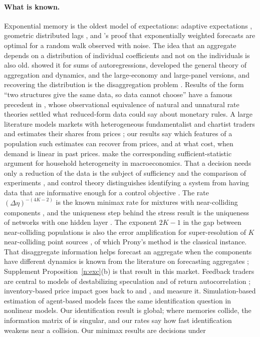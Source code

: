 \documentclass[12pt]{article}
\theoremstyle{definition}
\theoremstyle{remark}
\begin{document}
\paragraph{What is known.} Exponential memory is the oldest model of expectations: adaptive expectations \citep{cagan1956,nerlove1958}, geometric distributed lags \citep{koyck1954}, and \citet{muth1960}'s proof that exponentially weighted forecasts are optimal for a random walk observed with noise. The idea that an aggregate depends on a distribution of individual coefficients and not on the individuals is also old. \citet{granger1980} showed it for sums of autoregressions, \citet{forni1997} developed the general theory of aggregation and dynamics, \citet{zaffaroni2004} and \citet{pesaran2014} the large-economy and large-panel versions, and recovering the distribution is the disaggregation problem \citep{celov2008}. Results of the form ``two structures give the same data, so data cannot choose'' have a famous precedent in \citet{sargent1976}, whose observational equivalence of natural and unnatural rate theories settled what reduced-form data could say about monetary rules. A large literature models markets with heterogeneous fundamentalist and chartist traders \citep{brock1998,hommes2006} and estimates their shares from prices \citep{boswijk2007,franke2012,lux2018}; our results say which features of a population such estimates can recover from prices, and at what cost, when demand is linear in past prices. \citet{auclert2024} make the corresponding sufficient-statistic argument for household heterogeneity in macroeconomics. That a decision needs only a reduction of the data is the subject of sufficiency and the comparison of experiments \citep{blackwell1953,lecam1964}, and control theory distinguishes identifying a system from having data that are informative enough for a control objective \citep{vanwaarde2020}. The rate $(\Delta\eta)^{-(4K-2)}$ is the known minimax rate for mixtures with near-colliding components \citep{heinrich2018,wu2020}, and the uniqueness step behind the stress result is the uniqueness of networks with one hidden layer \citep{sussmann1992}. The exponent $2K-1$ in the gap between near-colliding populations is also the error amplification for super-resolution of $K$ near-colliding point sources \citep{batenkov2021}, of which Prony's method is the classical instance. That disaggregate information helps forecast an aggregate when the components have different dynamics is known from the literature on forecasting aggregates \citep{lutkepohl1987,hendry2011}; Supplement Proposition~\ref{n:exc}(b) is that result in this market. Feedback traders are central to models of destabilizing speculation and of return autocorrelation \citep{delong1990,cutler1990,sentana1992}; inventory-based price impact goes back to \citet{ho1981} and \citet{grossman1988}, and \citet{hendershott2014} measure it. Simulation-based estimation of agent-based models \citep{grazzini2015,platt2020} faces the same identification question in nonlinear models. Our identification result is global; where memories collide, the information matrix of \citet{rothenberg1971} is singular, and our rates say how fast identification weakens near a collision. Our minimax results are decisions under 
\end{document}
